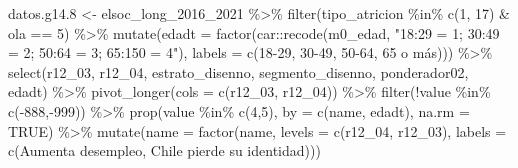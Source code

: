 \documentclass[
  12pt,
]{book}
\newenvironment{Shaded}{\begin{snugshade}}{\end{snugshade}}
\newcommand{\AttributeTok}[1]{\textcolor[rgb]{0.77,0.63,0.00}{#1}}
\newcommand{\ConstantTok}[1]{\textcolor[rgb]{0.00,0.00,0.00}{#1}}
\newcommand{\DecValTok}[1]{\textcolor[rgb]{0.00,0.00,0.81}{#1}}
\newcommand{\FloatTok}[1]{\textcolor[rgb]{0.00,0.00,0.81}{#1}}
\newcommand{\FunctionTok}[1]{\textcolor[rgb]{0.00,0.00,0.00}{#1}}
\newcommand{\NormalTok}[1]{#1}
\newcommand{\OtherTok}[1]{\textcolor[rgb]{0.56,0.35,0.01}{#1}}
\newcommand{\SpecialCharTok}[1]{\textcolor[rgb]{0.00,0.00,0.00}{#1}}
\newcommand{\StringTok}[1]{\textcolor[rgb]{0.31,0.60,0.02}{#1}}
\begin{document}
\begin{Shaded}
\begin{Highlighting}[]
\NormalTok{datos.g14}\FloatTok{.8} \OtherTok{\textless{}{-}}\NormalTok{ elsoc\_long\_2016\_2021 }\SpecialCharTok{\%\textgreater{}\%}
  \FunctionTok{filter}\NormalTok{(tipo\_atricion }\SpecialCharTok{\%in\%} \FunctionTok{c}\NormalTok{(}\DecValTok{1}\NormalTok{, }\DecValTok{17}\NormalTok{) }\SpecialCharTok{\&}\NormalTok{ ola }\SpecialCharTok{==} \DecValTok{5}\NormalTok{) }\SpecialCharTok{\%\textgreater{}\%} 
  \FunctionTok{mutate}\NormalTok{(}\AttributeTok{edadt =} \FunctionTok{factor}\NormalTok{(car}\SpecialCharTok{::}\FunctionTok{recode}\NormalTok{(m0\_edad, }\StringTok{"18:29 = 1; 30:49 = 2; 50:64 = 3; 65:150 = 4"}\NormalTok{),}
                           \AttributeTok{labels =} \FunctionTok{c}\NormalTok{(}\StringTok{\textquotesingle{}18{-}29\textquotesingle{}}\NormalTok{, }\StringTok{\textquotesingle{}30{-}49\textquotesingle{}}\NormalTok{, }\StringTok{\textquotesingle{}50{-}64\textquotesingle{}}\NormalTok{, }\StringTok{\textquotesingle{}65 o más\textquotesingle{}}\NormalTok{))) }\SpecialCharTok{\%\textgreater{}\%} 
  \FunctionTok{select}\NormalTok{(r12\_03, r12\_04, estrato\_disenno, segmento\_disenno, ponderador02, edadt) }\SpecialCharTok{\%\textgreater{}\%}
  \FunctionTok{pivot\_longer}\NormalTok{(}\AttributeTok{cols =} \FunctionTok{c}\NormalTok{(r12\_03, r12\_04)) }\SpecialCharTok{\%\textgreater{}\%} 
  \FunctionTok{filter}\NormalTok{(}\SpecialCharTok{!}\NormalTok{value }\SpecialCharTok{\%in\%} \FunctionTok{c}\NormalTok{(}\SpecialCharTok{{-}}\DecValTok{888}\NormalTok{,}\SpecialCharTok{{-}}\DecValTok{999}\NormalTok{)) }\SpecialCharTok{\%\textgreater{}\%} 
  \FunctionTok{prop}\NormalTok{(value }\SpecialCharTok{\%in\%} \FunctionTok{c}\NormalTok{(}\DecValTok{4}\NormalTok{,}\DecValTok{5}\NormalTok{), }\AttributeTok{by =} \FunctionTok{c}\NormalTok{(name, edadt), }\AttributeTok{na.rm =} \ConstantTok{TRUE}\NormalTok{) }\SpecialCharTok{\%\textgreater{}\%} 
  \FunctionTok{mutate}\NormalTok{(}\AttributeTok{name =} \FunctionTok{factor}\NormalTok{(name, }\AttributeTok{levels =} \FunctionTok{c}\NormalTok{(}\StringTok{\textquotesingle{}r12\_04\textquotesingle{}}\NormalTok{, }\StringTok{\textquotesingle{}r12\_03\textquotesingle{}}\NormalTok{), }
                       \AttributeTok{labels =} \FunctionTok{c}\NormalTok{(}\StringTok{\textquotesingle{}Aumenta desempleo\textquotesingle{}}\NormalTok{, }\StringTok{\textquotesingle{}Chile pierde su identidad\textquotesingle{}}\NormalTok{)))}


\end{Highlighting}
\end{Shaded}
\end{document}

